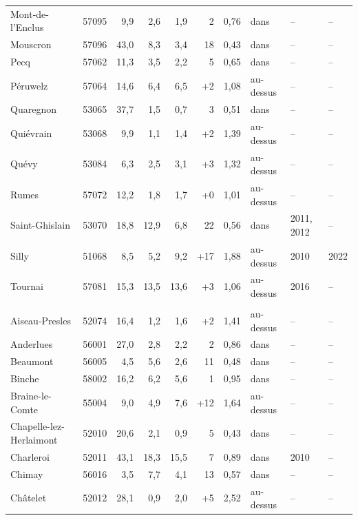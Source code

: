 \begin{longtable}{lrrrrrrlll}
Mont-de-l'Enclus & 57095 & 9{,}9 & 2{,}6 & 1{,}9 & \textminus{}2 & 0{,}76 & dans & -- & -- \\
Mouscron & 57096 & 43{,}0 & 8{,}3 & 3{,}4 & \textminus{}18 & 0{,}43 & dans & -- & -- \\
Pecq & 57062 & 11{,}3 & 3{,}5 & 2{,}2 & \textminus{}5 & 0{,}65 & dans & -- & -- \\
Péruwelz & 57064 & 14{,}6 & 6{,}4 & 6{,}5 & +2 & 1{,}08 & au-dessus & -- & -- \\
Quaregnon & 53065 & 37{,}7 & 1{,}5 & 0{,}7 & \textminus{}3 & 0{,}51 & dans & -- & -- \\
Quiévrain & 53068 & 9{,}9 & 1{,}1 & 1{,}4 & +2 & 1{,}39 & au-dessus & -- & -- \\
Quévy & 53084 & 6{,}3 & 2{,}5 & 3{,}1 & +3 & 1{,}32 & au-dessus & -- & -- \\
Rumes & 57072 & 12{,}2 & 1{,}8 & 1{,}7 & +0 & 1{,}01 & au-dessus & -- & -- \\
Saint-Ghislain & 53070 & 18{,}8 & 12{,}9 & 6{,}8 & \textminus{}22 & 0{,}56 & dans & 2011, 2012 & -- \\
Silly & 51068 & 8{,}5 & 5{,}2 & 9{,}2 & +17 & 1{,}88 & au-dessus & 2010 & 2022 \\
Tournai & 57081 & 15{,}3 & 13{,}5 & 13{,}6 & +3 & 1{,}06 & au-dessus & 2016 & -- \\
\addlinespace
\multicolumn{10}{l}{\textbf{Hainaut 2} (33 communes)} \\
Aiseau-Presles & 52074 & 16{,}4 & 1{,}2 & 1{,}6 & +2 & 1{,}41 & au-dessus & -- & -- \\
Anderlues & 56001 & 27{,}0 & 2{,}8 & 2{,}2 & \textminus{}2 & 0{,}86 & dans & -- & -- \\
Beaumont & 56005 & 4{,}5 & 5{,}6 & 2{,}6 & \textminus{}11 & 0{,}48 & dans & -- & -- \\
Binche & 58002 & 16{,}2 & 6{,}2 & 5{,}6 & \textminus{}1 & 0{,}95 & dans & -- & -- \\
Braine-le-Comte & 55004 & 9{,}0 & 4{,}9 & 7{,}6 & +12 & 1{,}64 & au-dessus & -- & -- \\
Chapelle-lez-Herlaimont & 52010 & 20{,}6 & 2{,}1 & 0{,}9 & \textminus{}5 & 0{,}43 & dans & -- & -- \\
Charleroi & 52011 & 43{,}1 & 18{,}3 & 15{,}5 & \textminus{}7 & 0{,}89 & dans & 2010 & -- \\
Chimay & 56016 & 3{,}5 & 7{,}7 & 4{,}1 & \textminus{}13 & 0{,}57 & dans & -- & -- \\
Châtelet & 52012 & 28{,}1 & 0{,}9 & 2{,}0 & +5 & 2{,}52 & au-dessus & -- & -- \\

\end{longtable}
